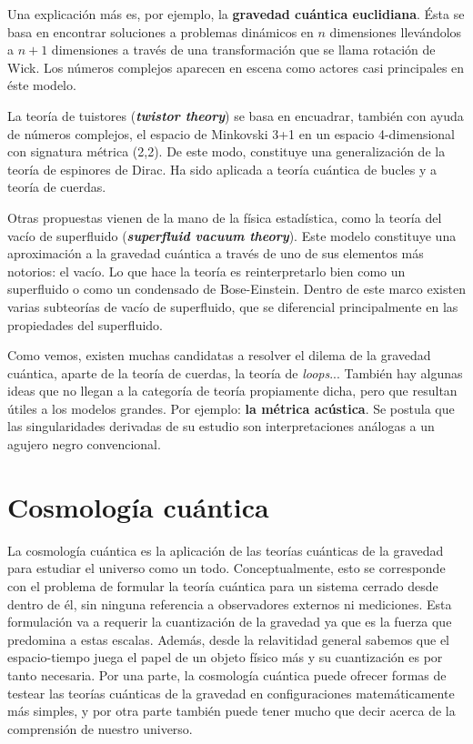 \documentclass[11pt,a4paper,titlepage]{article}
\begin{document}
Una explicación más es, por ejemplo, la \textbf{gravedad cuántica euclidiana}. Ésta se basa en encontrar soluciones a problemas dinámicos en $n$ dimensiones llevándolos a $n+1$ dimensiones a través de una transformación que se llama rotación de Wick. Los números complejos aparecen en escena como actores casi principales en éste modelo.

La teoría de tuistores (\textbf{\textit{twistor theory}}) se basa en encuadrar, también con ayuda de números complejos, el espacio de Minkovski 3+1 en un espacio 4-dimensional con signatura métrica (2,2). De este modo, constituye una generalización de la teoría de espinores de Dirac. Ha sido aplicada a teoría cuántica de bucles y a teoría de cuerdas.

Otras propuestas vienen de la mano de la física estadística, como la teoría del vacío de superfluido (\textbf{\textit{superfluid vacuum theory}}). Este modelo constituye una aproximación a la gravedad cuántica a través de uno de sus elementos más notorios: el vacío. Lo que hace la teoría es reinterpretarlo bien como un superfluido o como un condensado de Bose-Einstein. Dentro de este marco existen varias subteorías de vacío de superfluido, que se diferencial principalmente en las propiedades del superfluido.

Como vemos, existen muchas candidatas a resolver el dilema de la gravedad cuántica, aparte de la teoría de cuerdas, la teoría de \textit{loops}... También hay algunas ideas que no llegan a la categoría de teoría propiamente dicha, pero que resultan útiles a los modelos grandes. Por ejemplo: \textbf{la métrica acústica}. Se postula que las singularidades derivadas de su estudio son interpretaciones análogas a un agujero negro convencional.

%
%
%
%
\newpage
\section{Cosmología cuántica}

La cosmología cuántica es la aplicación de las teorías cuánticas de la gravedad para estudiar el universo como un todo. Conceptualmente, esto se corresponde con el problema de formular la teoría cuántica para un sistema cerrado desde dentro de él, sin ninguna referencia a observadores externos ni mediciones. Esta formulación va a requerir la cuantización de la gravedad ya que es la fuerza que predomina a estas escalas. Además, desde la relavitidad general sabemos que el espacio-tiempo juega el papel de un objeto físico más y su cuantización es por tanto necesaria. Por una parte, la cosmología cuántica puede ofrecer formas de testear las teorías cuánticas de la gravedad en configuraciones matemáticamente más simples, y por otra parte también puede tener mucho que decir acerca de la comprensión de nuestro universo.
\end{document}
